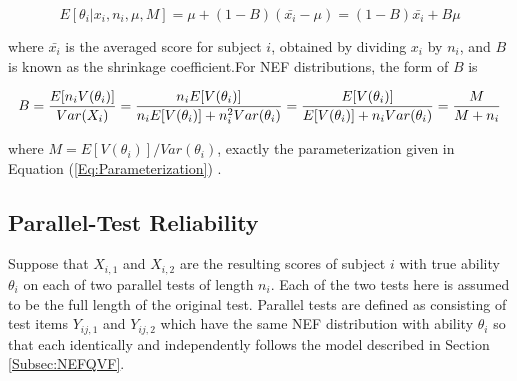 \documentclass[12pt,epsfig]{article}
\newcommand{\change}[1]{\textcolor{black}{#1}}
\begin{document}
\begin{equation}
 E[\theta_i | x_i, n_i, \mu, M] = \mu + (1 - B)(\bar{x_i} - \mu) = (1-B) \bar{x_i} + B \mu
\label{Eq:PosteriorMean}
\end{equation}

\noindent where $\bar{x_i}$ is the averaged score for subject $i$, obtained by dividing $x_i$ by $n_i$, and $B$ is known as the shrinkage coefficient.For NEF distributions, the form of $B$ is 

\begin{equation}
B = \change{\dfrac{E[n_i V(\theta_i)]}{Var(X_i)}} = \dfrac{n_iE[ V(\theta_i)]}{n_i E[ V(\theta_i)] + n_i^2 Var(\theta_i)} = \dfrac{E[V(\theta_i)]}{E[V(\theta_i)] + n_i Var(\theta_i)} = \dfrac{M}{M + n_i}
\label{Eq:NEFQVFB}
\end{equation} 

\noindent where $M = E[V(\theta_i)]/Var(\theta_i)$, exactly the parameterization given in Equation (\ref{Eq:Parameterization})  \citep{Morris1983}. 







\subsection{Parallel-Test Reliability}

Suppose that $X_{i,1}$ and $X_{i,2}$ are the resulting scores of subject $i$ with true ability $\theta_i$ on each of two parallel tests of length $n_i$. Each of the two tests here is assumed to be the full length of the original test. Parallel tests are defined as consisting of test items $Y_{ij,1}$ and $Y_{ij,2}$ which have the same NEF distribution with ability $\theta_i$ so that each identically and independently follows the model described in Section \ref{Subsec:NEFQVF}.
\end{document}
